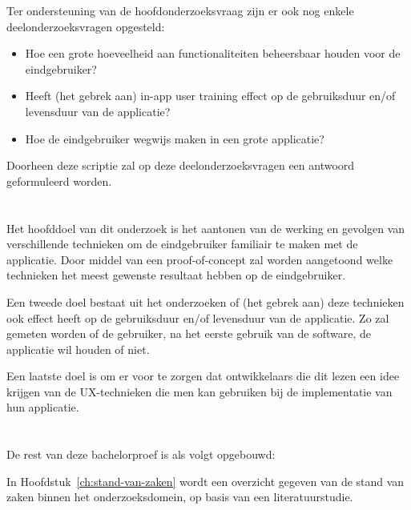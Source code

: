 Ter ondersteuning van de hoofdonderzoeksvraag zijn er ook nog enkele deelonderzoeksvragen opgesteld:

\begin{itemize}
    \item Hoe een grote hoeveelheid aan functionaliteiten beheersbaar houden voor de eindgebruiker?
    \item Heeft (het gebrek aan) in-app user training effect op de gebruiksduur en/of levensduur van de applicatie?
    \item Hoe de eindgebruiker wegwijs maken in een grote applicatie?
\end{itemize}

Doorheen deze scriptie zal op deze deelonderzoeksvragen een antwoord geformuleerd worden.

\section{}
\label{sec:onderzoeksdoelstelling}

Het hoofddoel van dit onderzoek is het aantonen van de werking en gevolgen van verschillende technieken om de eindgebruiker familiair te maken met de applicatie. Door middel van een proof-of-concept zal worden aangetoond welke technieken het meest gewenste resultaat hebben op de eindgebruiker.

Een tweede doel bestaat uit het onderzoeken of (het gebrek aan) deze technieken ook effect heeft op de gebruiksduur en/of levensduur van de applicatie. Zo zal gemeten worden of de gebruiker, na het eerste gebruik van de software, de applicatie wil houden of niet.

Een laatste doel is om er voor te zorgen dat ontwikkelaars die dit lezen een idee krijgen van de UX-technieken die men kan gebruiken bij de implementatie van hun applicatie.

\section{}
\label{sec:opzet-bachelorproef}

De rest van deze bachelorproef is als volgt opgebouwd:

In Hoofdstuk~\ref{ch:stand-van-zaken} wordt een overzicht gegeven van de stand van zaken binnen het onderzoeksdomein, op basis van een literatuurstudie.

